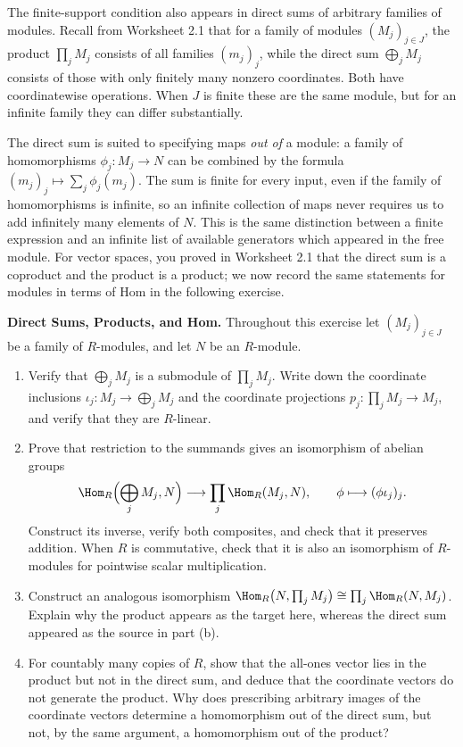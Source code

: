 \documentclass[12pt,reqno]{amsart}
\begin{document}
\hrulefill

The finite-support condition also appears in direct sums of arbitrary families of modules. Recall from Worksheet 2.1 that for a family of modules $(M_j)_{j\in J}$, the product $\prod_jM_j$ consists of all families $(m_j)_j$, while the direct sum $\bigoplus_jM_j$ consists of those with only finitely many nonzero coordinates. Both have coordinatewise operations. When $J$ is finite these are the same module, but for an infinite family they can differ substantially.

The direct sum is suited to specifying maps \emph{out of} a module: a family of homomorphisms $\phi_j:M_j\to N$ can be combined by the formula $(m_j)_j\mapsto\sum_j\phi_j(m_j)$. The sum is finite for every input, even if the family of homomorphisms is infinite, so an infinite collection of maps never requires us to add infinitely many elements of $N$. This is the same distinction between a finite expression and an infinite list of available generators which appeared in the free module. For vector spaces, you proved in Worksheet 2.1 that the direct sum is a coproduct and the product is a product; we now record the same statements for modules in terms of Hom in the following exercise.

\hrulefill

\begin{problems}
\item\label{p:sums} \textbf{Direct Sums, Products, and Hom.} Throughout this exercise let $(M_j)_{j\in J}$ be a family of $R$-modules, and let $N$ be an $R$-module.
\begin{enumerate}
\item Verify that $\bigoplus_jM_j$ is a submodule of $\prod_jM_j$. Write down the coordinate inclusions $\iota_j:M_j\to\bigoplus_jM_j$ and the coordinate projections $p_j:\prod_jM_j\to M_j$, and verify that they are $R$-linear.
\item Prove that restriction to the summands gives an isomorphism of abelian groups
\[
\Hom_R\Bigl(\bigoplus_jM_j,N\Bigr)\longrightarrow\prod_j\Hom_R(M_j,N),\qquad\phi\longmapsto(\phi\iota_j)_j.
\]
Construct its inverse, verify both composites, and check that it preserves addition. When $R$ is commutative, check that it is also an isomorphism of $R$-modules for pointwise scalar multiplication.
\item Construct an analogous isomorphism $\Hom_R\bigl(N,\prod_jM_j\bigr)\cong\prod_j\Hom_R(N,M_j)$. Explain why the product appears as the target here, whereas the direct sum appeared as the source in part (b).
\item For countably many copies of $R$, show that the all-ones vector lies in the product but not in the direct sum, and deduce that the coordinate vectors do not generate the product. Why does prescribing arbitrary images of the coordinate vectors determine a homomorphism out of the direct sum, but not, by the same argument, a homomorphism out of the product?
\end{enumerate}
\end{problems}
\end{document}

